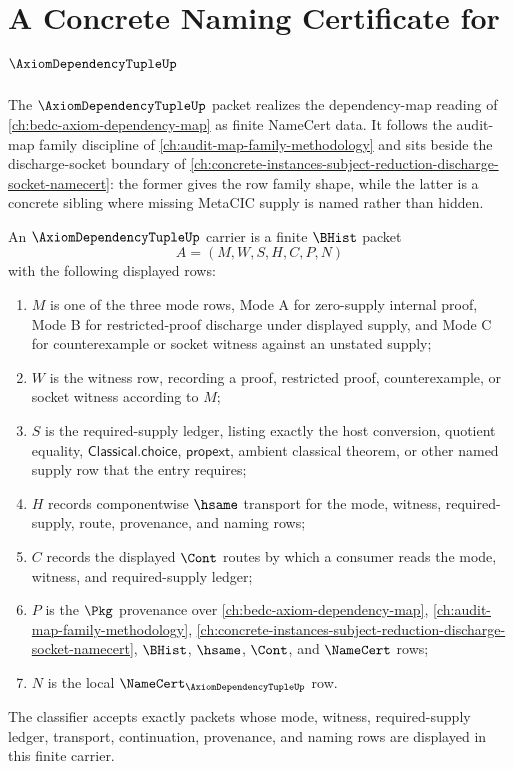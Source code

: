 \chapter{A Concrete Naming Certificate for $\AxiomDependencyTupleUp$}
\label{ch:concrete-instances-axiom-dependency-tuple-namecert}

The $\AxiomDependencyTupleUp$ packet realizes the dependency-map reading of
\autoref{ch:bedc-axiom-dependency-map} as finite NameCert data. It follows
the audit-map family discipline of \autoref{ch:audit-map-family-methodology}
and sits beside the discharge-socket boundary of
\autoref{ch:concrete-instances-subject-reduction-discharge-socket-namecert}:
the former gives the row family shape, while the latter is a concrete sibling
where missing MetaCIC supply is named rather than hidden.

\begin{definition}
\label{def:axiom-dependency-tuple-carrier}
An $\AxiomDependencyTupleUp$ carrier is a finite $\BHist$ packet
$$
A=(M,W,S,H,C,P,N)
$$
with the following displayed rows:
\begin{enumerate}
\item $M$ is one of the three mode rows, Mode A for zero-supply internal
proof, Mode B for restricted-proof discharge under displayed supply, and
Mode C for counterexample or socket witness against an unstated supply;
\item $W$ is the witness row, recording a proof, restricted proof,
counterexample, or socket witness according to $M$;
\item $S$ is the required-supply ledger, listing exactly the host conversion,
quotient equality, $\mathsf{Classical.choice}$, $\mathsf{propext}$, ambient
classical theorem, or other named supply row that the entry requires;
\item $H$ records componentwise $\hsame$ transport for the mode, witness,
required-supply, route, provenance, and naming rows;
\item $C$ records the displayed $\Cont$ routes by which a consumer reads the
mode, witness, and required-supply ledger;
\item $P$ is the $\Pkg$ provenance over \autoref{ch:bedc-axiom-dependency-map},
\autoref{ch:audit-map-family-methodology},
\autoref{ch:concrete-instances-subject-reduction-discharge-socket-namecert},
$\BHist$, $\hsame$, $\Cont$, and $\NameCert$ rows;
\item $N$ is the local $\NameCert_{\AxiomDependencyTupleUp}$ row.
\end{enumerate}
The classifier accepts exactly packets whose mode, witness, required-supply
ledger, transport, continuation, provenance, and naming rows are displayed in
this finite carrier.
\end{definition}

